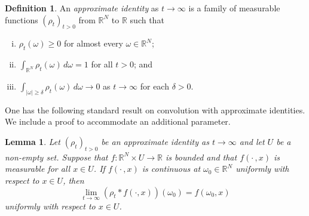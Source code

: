 \documentclass[a4paper, reqno,titlepage]{amsart}
\numberwithin{equation}{section}
\theoremstyle{plain}
\newtheorem{lemma}[theorem]{Lemma}
\theoremstyle{definition}
\newtheorem{definition}[theorem]{Definition}
\theoremstyle{remark}
\newcommand{\RR}{\mathbb{R}}
\begin{document}
\begin{definition}
  \label{def:approx-id}
  An \emph{approximate identity} as $t \to \infty$ is a family of measurable functions $(\rho_t)_{t > 0}$ from $\RR^N$ to $\RR$ such that
  \begin{enumerate}[(i)]
  \item $\rho_t(\omega) \geq 0$ for almost every $\omega \in \RR^N$;
  \item $\int_{\RR^N} \rho_t(\omega)\,d\omega = 1$ for all $t > 0$; and
  \item $\int_{|\omega| \geq \delta} \rho_t(\omega)\,d\omega \to 0$ as $t \to \infty$ for each $\delta > 0$.
  \end{enumerate}
\end{definition}
%
One has the following standard result on convolution with approximate identities. We include a proof to accommodate an additional parameter.
%
\begin{lemma}
  \label{lem:approx-id}
  Let $(\rho_t)_{t > 0}$ be an approximate identity as $t \to \infty$ and let $U$ be a non-empty set. Suppose that $f\colon\RR^N\times U\to\RR$ is bounded and that $f(\cdot\,,x)$ is measurable for all $x\in U$. If $f(\cdot\,,x)$ is continuous at $\omega_0\in\RR^N$ uniformly with respect to $x\in U$, then
  \begin{equation*}
    \lim_{t\to\infty}(\rho_t * f(\cdot,x))(\omega_0)
    =f(\omega_0,x)
  \end{equation*}
  uniformly with respect to $x\in U$.
\end{lemma}
\end{document}
